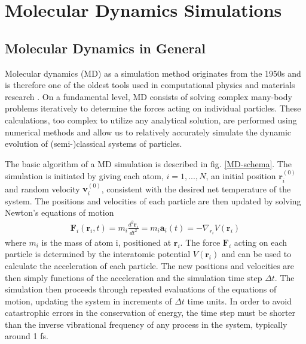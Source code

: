 \chapter{Molecular Dynamics Simulations}

\section{Molecular Dynamics in General}
Molecular dynamics (MD) as a simulation method originates from the 1950s and is therefore one of the oldest tools used in computational physics and materials research \cite{alder1957phase}.
On a fundamental level, MD consists of solving complex many-body problems iteratively to determine the forces acting on individual particles. 
These calculations, too complex  to utilize any analytical solution, are performed using numerical methods and allow us to relatively accurately simulate the dynamic evolution of (semi-)classical systems of particles. 

The basic algorithm of a MD simulation is described in fig. \ref{MD-schema}. 
The simulation is initiated by giving each atom, $i=1,...,N$, an initial position $\mathbf{r}_i^{(0)}$ and random velocity $\mathbf{v}_i^{(0)}$, consistent with the desired net temperature of the system. 
The positions and velocities of each particle are then updated by solving Newton's equations of motion
\begin{align}
\mathbf{F}_i(\mathbf{r}_i,t) = m_i\frac{d^2\mathbf{r}_i}{dt^2} = m_i\mathbf{a}_i(t) = -\nabla_{r_i}V(\mathbf{r}_i)
\end{align}
where $m_i$ is the mass of atom i, positioned at $\mathbf{r}_i$. 
The force $\mathbf{F}_i$ acting on each particle is determined by the interatomic potential $V(\mathbf{r}_i)$ and can be used to calculate the acceleration of each particle. 
The new positions and velocities are then simply functions of the acceleration and the simulation time step $\Delta t$. 
The simulation then proceeds through repeated evaluations of the equations of motion, updating the system in increments of $\Delta t$ time units. 
In order to avoid catastrophic errors in the conservation of energy, the time step must be shorter than the inverse vibrational frequency of any process in the system, typically around 1 fs.

